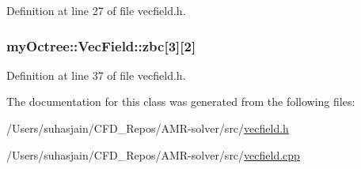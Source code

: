 Definition at line 27 of file vecfield.\+h.

\hypertarget{classmy_octree_1_1_vec_field_a8393be7c311149c9d4e449521c4f34a0}{}
\subsubsection[{zbc}]{ my\+Octree\+::\+Vec\+Field\+::zbc\mbox{[}3\mbox{]}\mbox{[}2\mbox{]}}\label{classmy_octree_1_1_vec_field_a8393be7c311149c9d4e449521c4f34a0}


Definition at line 37 of file vecfield.\+h.



The documentation for this class was generated from the following files\+:\begin{DoxyCompactItemize}
\item 
/\+Users/suhasjain/\+C\+F\+D\+\_\+\+Repos/\+A\+M\+R-\/solver/src/\hyperlink{vecfield_8h}{vecfield.\+h}\item 
/\+Users/suhasjain/\+C\+F\+D\+\_\+\+Repos/\+A\+M\+R-\/solver/src/\hyperlink{vecfield_8cpp}{vecfield.\+cpp}\end{DoxyCompactItemize}
